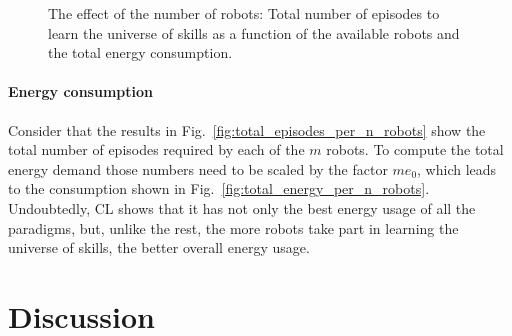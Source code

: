 \documentclass[12pt]{article}
\begin{document}
\begin{figure}[!h]
\begin{subfigure}[t]{0.45\textwidth}
	\end{subfigure}
	\hspace*{\fill}
	\caption[] {\label{fig:final_results} The effect of the number of robots:  Total number of episodes to learn the universe of skills as a function of the available robots and  the total energy consumption.}
\end{figure}

\paragraph*{Energy consumption}
Consider that the results in Fig.~\ref{fig:total_episodes_per_n_robots} show the total number of episodes required by each of the $m$ robots. To compute the total energy demand those numbers need to be scaled by the factor $m e_0$, which leads to the consumption shown in Fig.~\ref{fig:total_energy_per_n_robots}. Undoubtedly, CL shows that it has not only the best energy usage of all the paradigms, but, unlike the rest, the more robots take part in learning the universe of skills, the better overall energy usage.

\section*{Discussion}\label{sec:discussion}
\end{document}

